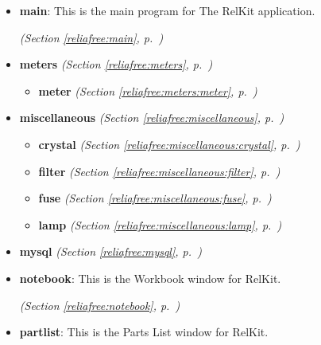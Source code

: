 \begin{itemize}
\item \textbf{main}: This is the main program for The RelKit application.



  \textit{(Section \ref{reliafree:main}, p.~\pageref{reliafree:main})}

\item \textbf{meters}
  \textit{(Section \ref{reliafree:meters}, p.~\pageref{reliafree:meters})}

  \begin{itemize}
\setlength{\parskip}{0ex}
    \item \textbf{meter}
  \textit{(Section \ref{reliafree:meters:meter}, p.~\pageref{reliafree:meters:meter})}

  \end{itemize}
\item \textbf{miscellaneous}
  \textit{(Section \ref{reliafree:miscellaneous}, p.~\pageref{reliafree:miscellaneous})}

  \begin{itemize}
\setlength{\parskip}{0ex}
    \item \textbf{crystal}
  \textit{(Section \ref{reliafree:miscellaneous:crystal}, p.~\pageref{reliafree:miscellaneous:crystal})}

    \item \textbf{filter}
  \textit{(Section \ref{reliafree:miscellaneous:filter}, p.~\pageref{reliafree:miscellaneous:filter})}

    \item \textbf{fuse}
  \textit{(Section \ref{reliafree:miscellaneous:fuse}, p.~\pageref{reliafree:miscellaneous:fuse})}

    \item \textbf{lamp}
  \textit{(Section \ref{reliafree:miscellaneous:lamp}, p.~\pageref{reliafree:miscellaneous:lamp})}

  \end{itemize}
\item \textbf{mysql}
  \textit{(Section \ref{reliafree:mysql}, p.~\pageref{reliafree:mysql})}

\item \textbf{notebook}: This is the Workbook window for RelKit.



  \textit{(Section \ref{reliafree:notebook}, p.~\pageref{reliafree:notebook})}

\item \textbf{partlist}: This is the Parts List window for RelKit.




\end{itemize}
